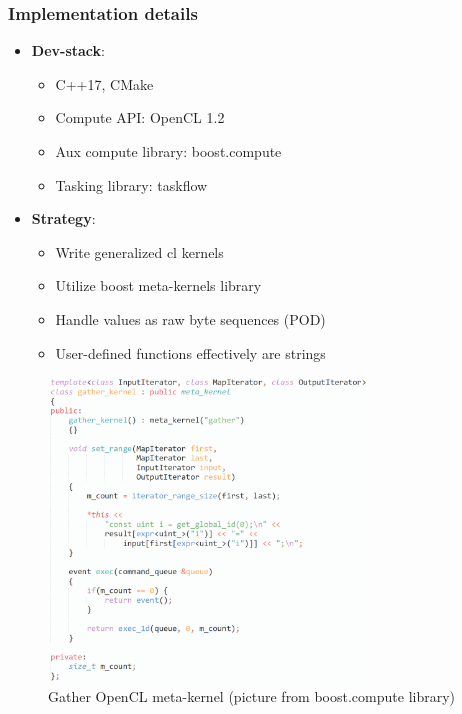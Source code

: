 \documentclass[aspectratio=169,xcolor=table,english]{beamer}
\begin{document}
\begin{frame}[fragile] \frametitle{Implementation details}
    \begin{minipage}[m]{0.55\linewidth}
        \begin{itemize}
            \item \textbf{Dev-stack}: 
            { 
            \begin{itemize}
                \item C++17, CMake
                \item Compute API: OpenCL 1.2\footnotemark[1]
                \item Aux compute library: boost.compute\footnotemark[2]
                \item Tasking library: taskflow\footnotemark[3]
            \end{itemize} 
            }
            \item \textbf{Strategy}: 
            {
            \begin{itemize}
                \item Write generalized cl kernels
                \item Utilize boost meta-kernels library
                \item Handle values as raw byte sequences (POD)
                \item User-defined functions effectively are strings
            \end{itemize}
            }
        \end{itemize}
    \end{minipage}\hfill
    \begin{minipage}[m]{0.45\linewidth}
        \begin{figure}
            \centering
            \includegraphics[width=0.75\textwidth]{figures/meta_programming.png}
            \caption{Gather OpenCL meta-kernel (picture from boost.compute library)}
            \label{fig:meta_programming}
        \end{figure}
    \end{minipage}
    

\end{frame}
\end{document}
